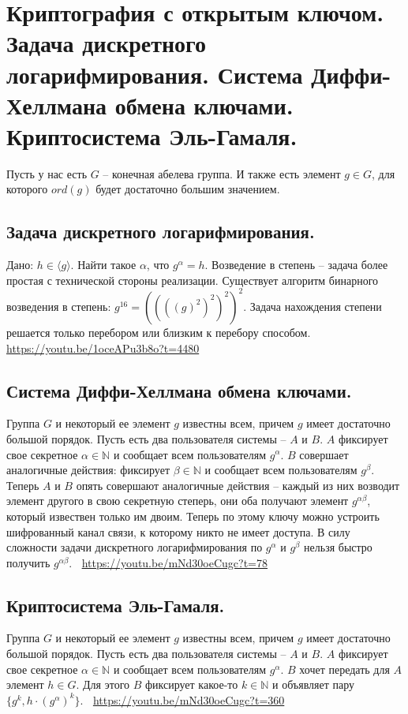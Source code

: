 \section{Криптография с открытым ключом. Задача дискретного логарифмирования. Система Диффи-Хеллмана обмена ключами. Криптосистема Эль-Гамаля.}

Пусть у нас есть $G$ -- конечная абелева группа. И также есть элемент $g \in G$, для которого $ord(g)$ будет достаточно большим значением.

\subsection{Задача дискретного логарифмирования.}
Дано: $h \in \langle g \rangle$. Найти такое $\alpha$, что $g^{\alpha} = h$.
Возведение в степень -- задача более простая с технической стороны реализации. Существует алгоритм бинарного возведения в степень: $g^{16} = ((((g)^2)^2)^2)^2$. Задача нахождения степени решается только перебором или близким к перебору способом.
\newline
\newline
\large \faYoutube \normalsize $\>$ \url{https://youtu.be/1oceAPu3b8o?t=4480}

\subsection{Система Диффи-Хеллмана обмена ключами.}
Группа $G$ и  некоторый ее элемент $g$ известны всем, причем $g$ имеет достаточно большой порядок.
Пусть есть два пользователя системы -- $A$ и $B$. $A$ фиксирует свое секретное $\alpha \in \mathbb{N}$ и сообщает всем пользователям $g^{\alpha}$. $B$ совершает аналогичные действия: фиксирует $\beta \in \mathbb{N}$ и сообщает всем пользователям $g^{\beta}$. Теперь $A$ и $B$ опять совершают аналогичные действия -- каждый из них возводит элемент другого в свою секретную степерь, они оба получают элемент $g^{\alpha \beta}$, который извествен только им двоим. Теперь по этому ключу можно устроить шифрованный канал связи, к которому никто не имеет доступа. В силу сложности задачи дискретного логарифмирования по $g^{\alpha}$ и $g^{\beta}$ нельзя быстро получить $g^{\alpha \beta}$.
\newline
\newline
\large \faYoutube \normalsize $\>$ \url{https://youtu.be/mNd30oeCugc?t=78}

\subsection{Криптосистема Эль-Гамаля.}
Группа $G$ и  некоторый ее элемент $g$ известны всем, причем $g$ имеет достаточно большой порядок. Пусть есть два пользователя системы -- $A$ и $B$. $A$ фиксирует свое секретное $\alpha \in \mathbb{N}$ и сообщает всем пользователям $g^{\alpha}$. $B$ хочет передать для $A$ элемент $h \in G$. Для этого $B$ фиксирует какое-то $k \in \mathbb{N}$ и объявляет пару $\{ g^k, h \cdot (g^{\alpha})^k \}$. 
\newline
\newline
\large \faYoutube \normalsize $\>$ \url{https://youtu.be/mNd30oeCugc?t=360}
